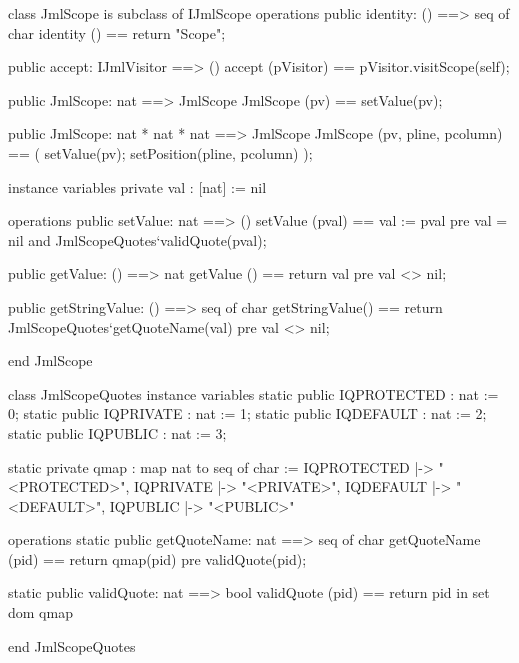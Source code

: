 \begin{vdm_al}
class JmlScope is subclass of IJmlScope
operations
  public identity: () ==> seq of char
  identity () == return "Scope";

  public accept: IJmlVisitor ==> ()
  accept (pVisitor) == pVisitor.visitScope(self);

  public JmlScope: nat ==> JmlScope
  JmlScope (pv) == setValue(pv);

  public JmlScope: nat * nat * nat ==> JmlScope
  JmlScope (pv, pline, pcolumn) == ( setValue(pv); setPosition(pline, pcolumn) );

instance variables
  private val : [nat] := nil

operations
  public setValue: nat ==> ()
  setValue (pval) == val := pval
    pre val = nil and JmlScopeQuotes`validQuote(pval);

  public getValue: () ==> nat
  getValue () == return val
    pre val <> nil;

  public getStringValue: () ==> seq of char
  getStringValue() == return JmlScopeQuotes`getQuoteName(val)
    pre val <> nil;

end JmlScope
\end{vdm_al}
\begin{vdm_al}
class JmlScopeQuotes
instance variables
  static public IQPROTECTED : nat := 0;
  static public IQPRIVATE : nat := 1;
  static public IQDEFAULT : nat := 2;
  static public IQPUBLIC : nat := 3;

  static private qmap : map nat to seq of char :=
    { IQPROTECTED |-> "<PROTECTED>",
      IQPRIVATE |-> "<PRIVATE>",
      IQDEFAULT |-> "<DEFAULT>",
      IQPUBLIC |-> "<PUBLIC>" }

operations
  static public getQuoteName: nat ==> seq of char
  getQuoteName (pid) ==
    return qmap(pid)
    pre validQuote(pid);

  static public validQuote: nat ==> bool
  validQuote (pid) == return pid in set dom qmap

end JmlScopeQuotes
\end{vdm_al}
